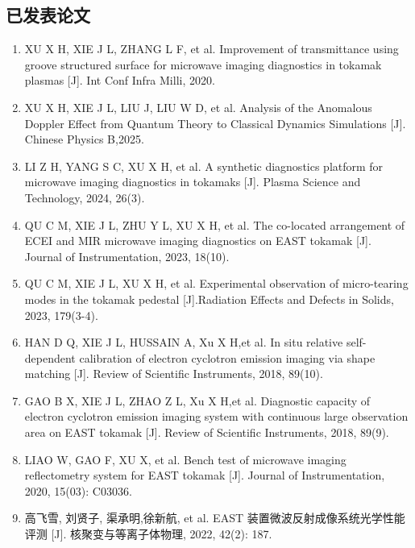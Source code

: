 
\begin{publications}

\section*{已发表论文}

\begin{enumerate}
\item XU X H, XIE J L, ZHANG L F, et al. Improvement of transmittance using groove structured surface for microwave imaging diagnostics in tokamak plasmas [J]. Int Conf Infra Milli, 2020.
\item XU X H, XIE J L, LIU J, LIU W D, et al. Analysis of the Anomalous Doppler Effect from Quantum Theory to Classical Dynamics Simulations [J]. Chinese Physics B,2025.
\item LI   Z H, YANG S C, XU X H, et al. A synthetic diagnostics platform for microwave imaging diagnostics in tokamaks [J]. Plasma Science and Technology, 2024, 26(3).
\item QU C M, XIE J L, ZHU Y L, XU X H, et al. The co-located arrangement of ECEI and MIR microwave imaging diagnostics on EAST tokamak [J]. Journal of Instrumentation, 2023, 18(10).
\item QU C M, XIE J L, XU X H, et al. Experimental observation of micro-tearing modes in the tokamak pedestal [J].Radiation Effects and Defects in Solids, 2023, 179(3-4).
\item HAN D Q, XIE J L, HUSSAIN A, Xu X H,et al. In situ relative self-dependent calibration of electron cyclotron emission imaging via shape matching [J]. Review of Scientific Instruments, 2018, 89(10).
\item GAO B X, XIE J L, ZHAO Z L, Xu X H,et al. Diagnostic capacity of electron cyclotron emission imaging system with continuous large observation area on EAST tokamak [J]. Review of Scientific Instruments, 2018, 89(9).
\item
LIAO W, GAO F, XU X, et al. Bench test of microwave imaging reflectometry system for EAST tokamak [J]. Journal of Instrumentation, 2020, 15(03): C03036.
\item
高飞雪, 刘贤子, 渠承明,徐新航, et al. EAST 装置微波反射成像系统光学性能评测 [J]. 核聚变与等离子体物理, 2022, 42(2): 187.

\end{enumerate}
\end{publications}
